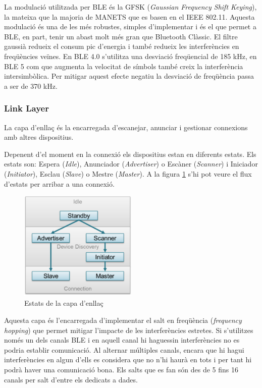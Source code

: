 La modulació utilitzada per BLE és la GFSK (\textit{Gaussian Frequency Shift Keying}), la mateixa que la majoria de MANETS que es basen en el IEEE 802.11.
Aquesta modulació és una de les més robustes, simples d'implementar i és el que permet a BLE, en part, tenir un abast molt més gran que Bluetooth Clàssic.
El filtre gaussià redueix el consum pic d'energia \cite{BLE_Review} i també redueix les interferències en freqüències veïnes.
En BLE 4.0 s'utilitza una desviació freqüencial de 185 kHz, en BLE 5 com que augmenta la velocitat de símbols també creix la interferència intersimbòlica.
Per mitigar aquest efecte negatiu la desviació de freqüència passa a ser de 370 kHz.


\subsubsection{Link Layer}
La capa d'enllaç és la encarregada d'escanejar, anunciar i gestionar connexions amb altres dispositius.

Depenent d'el moment en la connexió els dispositius estan en diferents estats.
Els estats son: Espera (\textit{Idle}), Anunciador (\textit{Advertiser}) o Escàner (\textit{Scanner}) i Iniciador (\textit{Initiator}), Esclau (\textit{Slave}) o Mestre (\textit{Master}).
A la figura \ref{Link_State_Diagram} s'hi pot veure el flux d'estats per arribar a una connexió.

\begin{figure}[!h]
	\begin{center}
		\includegraphics[width=0.5\textwidth]{./images/gap_state_diagram.png}
		\caption{Estats de la capa d'enllaç \cite{Link_Layer_states}}
		\label{Link_State_Diagram}
	\end{center}
\end{figure}

Aquesta capa és l'encarregada d'implementar el salt en freqüència (\textit{frequency hopping}) que permet mitigar l'impacte de les interferències estretes.
Si s'utilitzes només un dels canals BLE i en aquell canal hi haguessin interferències no es podria establir comunicació.
Al alternar múltiples canals, encara que hi hagui interferències en algun d'ells es considera que no n'hi haurà en tots i per tant hi podrà haver una comunicació bona.
Els salts que es fan són des de 5 fins 16 canals per salt d'entre els dedicats a dades.


